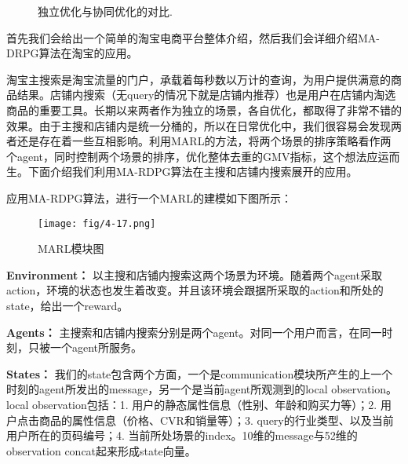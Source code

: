 \begin{figure}[htbp]
	\centering
	\caption{独立优化与协同优化的对比. %
	 }                     
	\label{fig:system}   
\end{figure}

首先我们会给出一个简单的淘宝电商平台整体介绍，然后我们会详细介绍MA-DRPG算法在淘宝的应用。

淘宝主搜索是淘宝流量的门户，承载着每秒数以万计的查询，为用户提供满意的商品结果。店铺内搜索（无query的情况下就是店铺内推荐）也是用户在店铺内淘选商品的重要工具。长期以来两者作为独立的场景，各自优化，都取得了非常不错的效果。由于主搜和店铺内是统一分桶的，所以在日常优化中，我们很容易会发现两者还是存在着一些互相影响。利用MARL的方法，将两个场景的排序策略看作两个agent，同时控制两个场景的排序，优化整体去重的GMV指标，这个想法应运而生。下面介绍我们利用MA-RDPG算法在主搜和店铺内搜索展开的应用。

应用MA-RDPG算法，进行一个MARL的建模如下图所示：
\begin{figure}[!h]
\centering
\texttt{[image: fig/4-17.png]}
\caption{ MARL模块图}
\end{figure}

\textbf{Environment：} 以主搜和店铺内搜索这两个场景为环境。随着两个agent采取action，环境的状态也发生着改变。并且该环境会跟据所采取的action和所处的state，给出一个reward。

\textbf{Agents：} 主搜索和店铺内搜索分别是两个agent。对同一个用户而言，在同一时刻，只被一个agent所服务。

\textbf{States：} 我们的state包含两个方面，一个是communication模块所产生的上一个时刻的agent所发出的message，另一个是当前agent所观测到的local observation。local observation包括：1. 用户的静态属性信息（性别、年龄和购买力等）；2. 用户点击商品的属性信息（价格、CVR和销量等）；3. query的行业类型、以及当前用户所在的页码编号；4. 当前所处场景的index。10维的message与52维的observation concat起来形成state向量。

